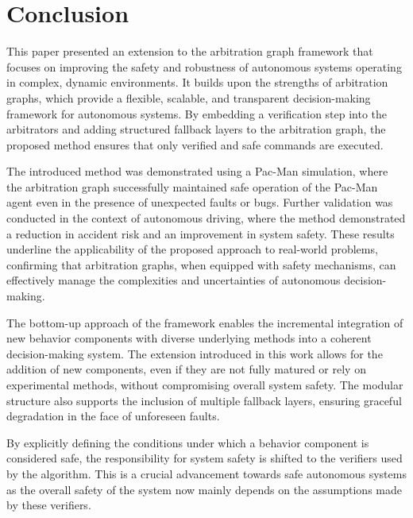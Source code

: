 \section{Conclusion}
This paper presented an extension to the arbitration graph framework that focuses on improving the safety and robustness of autonomous systems operating in complex, dynamic environments.
It builds upon the strengths of arbitration graphs, which provide a flexible, scalable, and transparent decision-making framework for autonomous systems.
By embedding a verification step into the arbitrators and adding structured fallback layers to the arbitration graph,
the proposed method ensures that only verified and safe commands are executed.

The introduced method was demonstrated using a Pac-Man simulation, where the arbitration graph successfully maintained safe operation of the Pac-Man agent even in the presence of unexpected faults or bugs.
%
Further validation was conducted in the context of autonomous driving, where the method demonstrated a reduction in accident risk and an improvement in system safety.
These results underline the applicability of the proposed approach to real-world problems,
confirming that arbitration graphs, when equipped with safety mechanisms,
can effectively manage the complexities and uncertainties of autonomous decision-making.

The bottom-up approach of the framework enables the incremental integration of new behavior components with diverse underlying methods into a coherent decision-making system.
The extension introduced in this work allows for the addition of new components, even if they are not fully matured or rely on experimental methods, without compromising overall system safety.
The modular structure also supports the inclusion of multiple fallback layers, ensuring graceful degradation in the face of unforeseen faults.

By explicitly defining the conditions under which a behavior component is considered safe,
the responsibility for system safety is shifted to the verifiers used by the algorithm.
This is a crucial advancement towards safe autonomous systems as
the overall safety of the system now mainly depends on the assumptions made by these verifiers.

